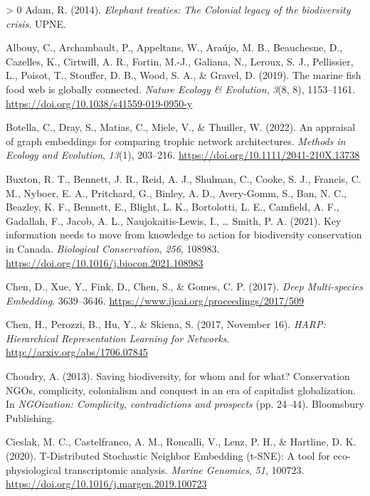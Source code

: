 \documentclass[10pt,oneside]{article}
\newlength{\cslhangindent}
\newenvironment{CSLReferences}[3] %
 {%
  \setlength{\parindent}{0pt}
  \ifodd #1 \everypar{\setlength{\hangindent}{\cslhangindent}}\ignorespaces\fi
  \ifnum #2 > 0
  \setlength{\parskip}{#2\baselineskip}
  \fi
 }%
 {}
\begin{document}
\hypertarget{refs}{}
\begin{CSLReferences}{1}{0}
\leavevmode\hypertarget{ref-Adam2014EleTre}{}%
Adam, R. (2014). \emph{Elephant treaties: The Colonial legacy of the
biodiversity crisis}. UPNE.

\leavevmode\hypertarget{ref-Albouy2019MarFis}{}%
Albouy, C., Archambault, P., Appeltans, W., Araújo, M. B., Beauchesne,
D., Cazelles, K., Cirtwill, A. R., Fortin, M.-J., Galiana, N., Leroux,
S. J., Pellissier, L., Poisot, T., Stouffer, D. B., Wood, S. A., \&
Gravel, D. (2019). The marine fish food web is globally connected.
\emph{Nature Ecology \& Evolution}, \emph{3}(8, 8), 1153--1161.
\url{https://doi.org/10.1038/s41559-019-0950-y}

\leavevmode\hypertarget{ref-Botella2022AppGra}{}%
Botella, C., Dray, S., Matias, C., Miele, V., \& Thuiller, W. (2022). An
appraisal of graph embeddings for comparing trophic network
architectures. \emph{Methods in Ecology and Evolution}, \emph{13}(1),
203--216. \url{https://doi.org/10.1111/2041-210X.13738}

\leavevmode\hypertarget{ref-Buxton2021KeyInf}{}%
Buxton, R. T., Bennett, J. R., Reid, A. J., Shulman, C., Cooke, S. J.,
Francis, C. M., Nyboer, E. A., Pritchard, G., Binley, A. D., Avery-Gomm,
S., Ban, N. C., Beazley, K. F., Bennett, E., Blight, L. K., Bortolotti,
L. E., Camfield, A. F., Gadallah, F., Jacob, A. L., Naujokaitis-Lewis,
I., \ldots{} Smith, P. A. (2021). Key information needs to move from
knowledge to action for biodiversity conservation in Canada.
\emph{Biological Conservation}, \emph{256}, 108983.
\url{https://doi.org/10.1016/j.biocon.2021.108983}

\leavevmode\hypertarget{ref-Chen2017DeeMul}{}%
Chen, D., Xue, Y., Fink, D., Chen, S., \& Gomes, C. P. (2017).
\emph{Deep Multi-species Embedding}. 3639--3646.
\url{https://www.ijcai.org/proceedings/2017/509}

\leavevmode\hypertarget{ref-Chen2017HarHie}{}%
Chen, H., Perozzi, B., Hu, Y., \& Skiena, S. (2017, November 16).
\emph{HARP: Hierarchical Representation Learning for Networks}.
\url{http://arxiv.org/abs/1706.07845}

\leavevmode\hypertarget{ref-Choudry2013SavBio}{}%
Choudry, A. (2013). Saving biodiversity, for whom and for what?
Conservation NGOs, complicity, colonialism and conquest in an era of
capitalist globalization. In \emph{NGOization: Complicity,
contradictions and prospects} (pp. 24--44). Bloomsbury Publishing.

\leavevmode\hypertarget{ref-Cieslak2020TdiSto}{}%
Cieslak, M. C., Castelfranco, A. M., Roncalli, V., Lenz, P. H., \&
Hartline, D. K. (2020). T-Distributed Stochastic Neighbor Embedding
(t-SNE): A tool for eco-physiological transcriptomic analysis.
\emph{Marine Genomics}, \emph{51}, 100723.
\url{https://doi.org/10.1016/j.margen.2019.100723}


\end{CSLReferences}
\end{document}
